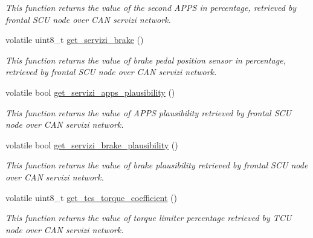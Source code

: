\begin{DoxyCompactItemize}
\begin{DoxyCompactList}\small\item\em This function returns the value of the second A\+P\+PS in percentage, retrieved by frontal S\+CU node over C\+AN servizi network. \end{DoxyCompactList}\item 
volatile uint8\+\_\+t \mbox{\hyperlink{group___c_a_n__servizi__group_ga21c09880bef645f24962658ef3dbb16e}{get\+\_\+servizi\+\_\+brake}} ()
\begin{DoxyCompactList}\small\item\em This function returns the value of brake pedal position sensor in percentage, retrieved by frontal S\+CU node over C\+AN servizi network. \end{DoxyCompactList}\item 
volatile bool \mbox{\hyperlink{group___c_a_n__servizi__group_ga66135a8978149fc6fa0b62446131ce95}{get\+\_\+servizi\+\_\+apps\+\_\+plausibility}} ()
\begin{DoxyCompactList}\small\item\em This function returns the value of A\+P\+PS plausibility retrieved by frontal S\+CU node over C\+AN servizi network. \end{DoxyCompactList}\item 
volatile bool \mbox{\hyperlink{group___c_a_n__servizi__group_ga064fdc5f825b2d50b1b13509e3f135d2}{get\+\_\+servizi\+\_\+brake\+\_\+plausibility}} ()
\begin{DoxyCompactList}\small\item\em This function returns the value of brake plausibility retrieved by frontal S\+CU node over C\+AN servizi network. \end{DoxyCompactList}\item 
volatile uint8\+\_\+t \mbox{\hyperlink{group___c_a_n__servizi__group_ga68bca94de95a77a3366f46eed661193f}{get\+\_\+tcs\+\_\+torque\+\_\+coefficient}} ()
\begin{DoxyCompactList}\small\item\em This function returns the value of torque limiter percentage retrieved by T\+CU node over C\+AN servizi network. \end{DoxyCompactList}\end{DoxyCompactItemize}
